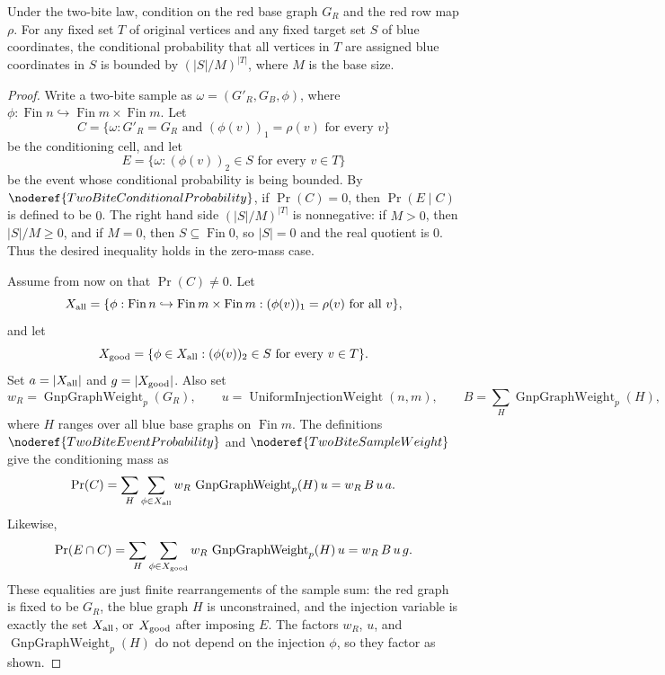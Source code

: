 \begin{lemma}
Under the two-bite law, condition on the red base graph $G_R$ and the red row map $\rho$. For any fixed set $T$ of original vertices and any fixed target set $S$ of blue coordinates, the conditional probability that all vertices in $T$ are assigned blue coordinates in $S$ is bounded by $(|S|/M)^{|T|}$, where $M$ is the base size.
\end{lemma}
\begin{proof}
Write a two-bite sample as \(\omega=(G'_R,G_B,\phi)\), where
\(\phi:\operatorname{Fin} n\hookrightarrow \operatorname{Fin} m\times
\operatorname{Fin} m\).  Let
\[
C=\{\omega:G'_R=G_R\text{ and }(\phi(v))_1=\rho(v)\text{ for every }v\}
\]
be the conditioning cell, and let
\[
E=\{\omega:(\phi(v))_2\in S\text{ for every }v\in T\}
\]
be the event whose conditional probability is being bounded.  By
\(\noderef{TwoBiteConditionalProbability}\), if
\(\Pr(C)=0\), then \(\Pr(E\mid C)\) is defined to be \(0\).  The right hand
side \((|S|/M)^{|T|}\) is nonnegative: if \(M>0\), then \(|S|/M\ge 0\), and
if \(M=0\), then \(S\subseteq\operatorname{Fin}0\), so \(|S|=0\) and the
real quotient is \(0\).  Thus the desired inequality holds in the zero-mass
case.

Assume from now on that \(\Pr(C)\ne 0\).  Let
\[
X_{\rm all}
=\{\phi:\operatorname{Fin} n\hookrightarrow
\operatorname{Fin} m\times\operatorname{Fin} m:
(\phi(v))_1=\rho(v)\text{ for all }v\},
\]
and let
\[
X_{\rm good}
=\{\phi\in X_{\rm all}:(\phi(v))_2\in S\text{ for every }v\in T\}.
\]
Set \(a=|X_{\rm all}|\) and \(g=|X_{\rm good}|\).  Also set
\[
w_R=\operatorname{GnpGraphWeight}_p(G_R),\qquad
u=\operatorname{UniformInjectionWeight}(n,m),\qquad
B=\sum_{H}\operatorname{GnpGraphWeight}_p(H),
\]
where \(H\) ranges over all blue base graphs on \(\operatorname{Fin} m\).
The definitions \(\noderef{TwoBiteEventProbability}\) and
\(\noderef{TwoBiteSampleWeight}\) give the conditioning mass as
\[
\Pr(C)
=\sum_{H}\sum_{\phi\in X_{\rm all}}w_R\,
  \operatorname{GnpGraphWeight}_p(H)\,u
=w_R\,B\,u\,a.
\]
Likewise,
\[
\Pr(E\cap C)
=\sum_{H}\sum_{\phi\in X_{\rm good}}w_R\,
  \operatorname{GnpGraphWeight}_p(H)\,u
=w_R\,B\,u\,g.
\]
These equalities are just finite rearrangements of the sample sum: the red
graph is fixed to be \(G_R\), the blue graph \(H\) is unconstrained, and the
injection variable is exactly the set \(X_{\rm all}\), or \(X_{\rm good}\)
after imposing \(E\).  The factors \(w_R\), \(u\), and
\(\operatorname{GnpGraphWeight}_p(H)\) do not depend on the injection
\(\phi\), so they factor as shown.


\end{proof}
